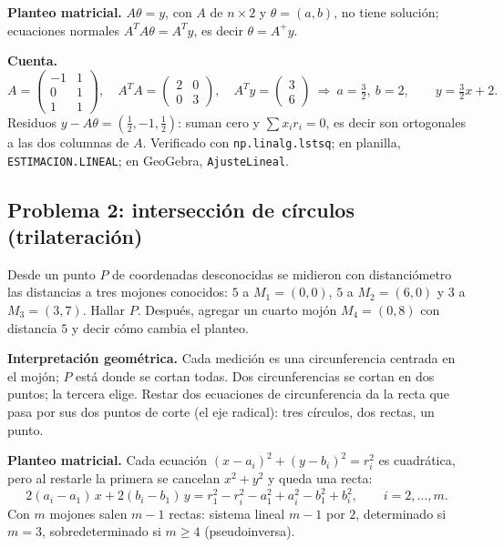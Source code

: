 \textbf{Planteo matricial.} \(A\theta=y\), con \(A\) de \(n\times2\) y
\(\theta=(a,b)\), no tiene solución; ecuaciones normales \(A^TA\theta=A^Ty\), es decir
\(\theta=A^{+}y\).

\textbf{Cuenta.}
\[
  A=\begin{pmatrix}-1&1\\0&1\\1&1\end{pmatrix},\quad
  A^TA=\begin{pmatrix}2&0\\0&3\end{pmatrix},\quad A^Ty=\begin{pmatrix}3\\6\end{pmatrix}
  \ \Rightarrow\ a=\tfrac32,\ b=2,\qquad y=\tfrac32x+2 .
\]
Residuos \(y-A\theta=(\tfrac12,-1,\tfrac12)\): suman cero y \(\sum x_ir_i=0\), es decir
son ortogonales a las dos columnas de \(A\). Verificado con \texttt{np.linalg.lstsq};
en planilla, \texttt{ESTIMACION.LINEAL}; en GeoGebra, \texttt{AjusteLineal}.

\subsection{Problema 2: intersección de círculos (trilateración)}

\begin{enunciado}[Enunciado]
Desde un punto \(P\) de coordenadas desconocidas se midieron con distanciómetro las
distancias a tres mojones conocidos: \(5\) a \(M_1=(0,0)\), \(5\) a \(M_2=(6,0)\) y \(3\)
a \(M_3=(3,7)\). Hallar \(P\). Después, agregar un cuarto mojón \(M_4=(0,8)\) con distancia
\(5\) y decir cómo cambia el planteo.
\end{enunciado}

\textbf{Interpretación geométrica.} Cada medición es una circunferencia centrada en el
mojón; \(P\) está donde se cortan todas. Dos circunferencias se cortan en dos puntos; la
tercera elige. Restar dos ecuaciones de circunferencia da la recta que pasa por sus dos
puntos de corte (el eje radical): tres círculos, dos rectas, un punto.

\textbf{Planteo matricial.} Cada ecuación \((x-a_i)^2+(y-b_i)^2=r_i^2\) es cuadrática,
pero al restarle la primera se cancelan \(x^2+y^2\) y queda una recta:
\[
  2(a_i-a_1)\,x+2(b_i-b_1)\,y=r_1^2-r_i^2-a_1^2+a_i^2-b_1^2+b_i^2 ,\qquad i=2,\dots,m .
\]
Con \(m\) mojones salen \(m-1\) rectas: sistema lineal \(m-1\) por \(2\), determinado si
\(m=3\), sobredeterminado si \(m\ge4\) (pseudoinversa).

